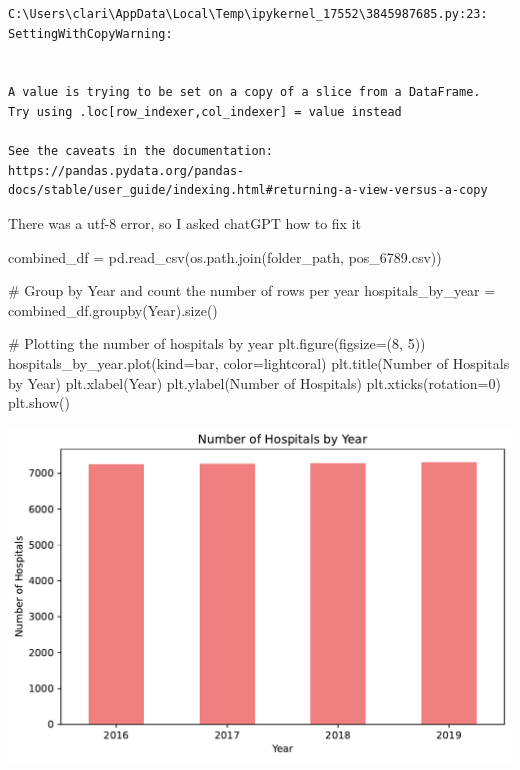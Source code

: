 \documentclass[
  letterpaper,
  DIV=11,
  numbers=noendperiod]{scrartcl}
\newenvironment{Shaded}{\begin{snugshade}}{\end{snugshade}}
\newcommand{\CommentTok}[1]{\textcolor[rgb]{0.37,0.37,0.37}{#1}}
\newcommand{\DecValTok}[1]{\textcolor[rgb]{0.68,0.00,0.00}{#1}}
\newcommand{\NormalTok}[1]{\textcolor[rgb]{0.00,0.23,0.31}{#1}}
\newcommand{\OperatorTok}[1]{\textcolor[rgb]{0.37,0.37,0.37}{#1}}
\newcommand{\StringTok}[1]{\textcolor[rgb]{0.13,0.47,0.30}{#1}}
\begin{document}
\begin{verbatim}
C:\Users\clari\AppData\Local\Temp\ipykernel_17552\3845987685.py:23: SettingWithCopyWarning:


A value is trying to be set on a copy of a slice from a DataFrame.
Try using .loc[row_indexer,col_indexer] = value instead

See the caveats in the documentation: https://pandas.pydata.org/pandas-docs/stable/user_guide/indexing.html#returning-a-view-versus-a-copy
\end{verbatim}

There was a utf-8 error, so I asked chatGPT how to fix it

\begin{Shaded}
\begin{Highlighting}[]
\NormalTok{combined\_df }\OperatorTok{=}\NormalTok{ pd.read\_csv(os.path.join(folder\_path, }\StringTok{\textquotesingle{}pos\_6789.csv\textquotesingle{}}\NormalTok{))}

\CommentTok{\# Group by \textquotesingle{}Year\textquotesingle{} and count the number of rows per year}
\NormalTok{hospitals\_by\_year }\OperatorTok{=}\NormalTok{ combined\_df.groupby(}\StringTok{\textquotesingle{}Year\textquotesingle{}}\NormalTok{).size()}

\CommentTok{\# Plotting the number of hospitals by year}
\NormalTok{plt.figure(figsize}\OperatorTok{=}\NormalTok{(}\DecValTok{8}\NormalTok{, }\DecValTok{5}\NormalTok{))}
\NormalTok{hospitals\_by\_year.plot(kind}\OperatorTok{=}\StringTok{\textquotesingle{}bar\textquotesingle{}}\NormalTok{, color}\OperatorTok{=}\StringTok{\textquotesingle{}lightcoral\textquotesingle{}}\NormalTok{)}
\NormalTok{plt.title(}\StringTok{\textquotesingle{}Number of Hospitals by Year\textquotesingle{}}\NormalTok{)}
\NormalTok{plt.xlabel(}\StringTok{\textquotesingle{}Year\textquotesingle{}}\NormalTok{)}
\NormalTok{plt.ylabel(}\StringTok{\textquotesingle{}Number of Hospitals\textquotesingle{}}\NormalTok{)}
\NormalTok{plt.xticks(rotation}\OperatorTok{=}\DecValTok{0}\NormalTok{)}
\NormalTok{plt.show()}
\end{Highlighting}
\end{Shaded}

\includegraphics{pset4_ANSWERS_files/figure-pdf/cell-6-output-1.pdf}
\end{document}
